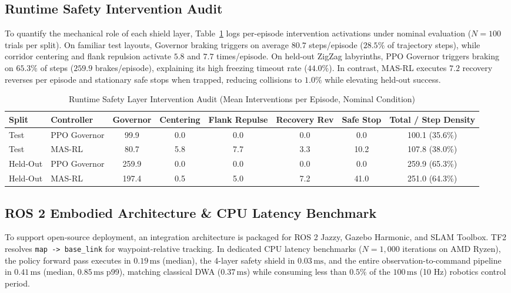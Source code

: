 \documentclass[runningheads]{llncs}
\begin{document}
\subsection{Runtime Safety Intervention Audit}
To quantify the mechanical role of each shield layer, Table~\ref{tab:interventions} logs per-episode intervention activations under nominal evaluation ($N=100$ trials per split). On familiar test layouts, Governor braking triggers on average $80.7$ steps/episode ($28.5\%$ of trajectory steps), while corridor centering and flank repulsion activate $5.8$ and $7.7$ times/episode. On held-out ZigZag labyrinths, PPO Governor triggers braking on $65.3\%$ of steps ($259.9$ brakes/episode), explaining its high freezing timeout rate ($44.0\%$). In contrast, MAS-RL executes $7.2$ recovery reverses per episode and stationary safe stops when trapped, reducing collisions to $1.0\%$ while elevating held-out success.

\begin{table}[h]
\centering
\caption{Runtime Safety Layer Intervention Audit (Mean Interventions per Episode, Nominal Condition)}
\label{tab:interventions}
\scriptsize
\begin{tabular}{llcccccc}
\toprule
\textbf{Split} & \textbf{Controller} & \textbf{Governor} & \textbf{Centering} & \textbf{Flank Repulse} & \textbf{Recovery Rev} & \textbf{Safe Stop} & \textbf{Total / Step Density} \\
\midrule
Test & PPO Governor & 99.9 & 0.0 & 0.0 & 0.0 & 0.0 & 100.1 (35.6\%) \\
Test & MAS-RL & 80.7 & 5.8 & 7.7 & 3.3 & 10.2 & 107.8 (38.0\%) \\
\midrule
Held-Out & PPO Governor & 259.9 & 0.0 & 0.0 & 0.0 & 0.0 & 259.9 (65.3\%) \\
Held-Out & MAS-RL & 197.4 & 0.5 & 5.0 & 7.2 & 41.0 & 251.0 (64.3\%) \\
\bottomrule
\end{tabular}
\end{table}

\subsection{ROS 2 Embodied Architecture \& CPU Latency Benchmark}
To support open-source deployment, an integration architecture is packaged for ROS 2 Jazzy, Gazebo Harmonic, and SLAM Toolbox. TF2 resolves \texttt{map -> base\_link} for waypoint-relative tracking. In dedicated CPU latency benchmarks ($N=1{,}000$ iterations on AMD Ryzen), the policy forward pass executes in $0.19\,\text{ms}$ (median), the 4-layer safety shield in $0.03\,\text{ms}$, and the entire observation-to-command pipeline in $0.41\,\text{ms}$ (median, $0.85\,\text{ms}$ p99), matching classical DWA ($0.37\,\text{ms}$) while consuming less than $0.5\%$ of the $100\,\text{ms}$ (10 Hz) robotics control period.
\end{document}
